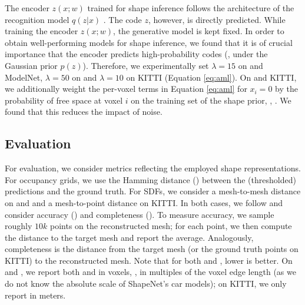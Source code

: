 
The encoder $z(x;w)$ trained for shape inference follows the architecture of the recognition model $q(z | x)$ . The code $z$, however, is directly predicted. While training the encoder $z(x;w)$, the generative model is kept fixed. In order to obtain well-performing models for shape inference, we found that it is of crucial importance that the encoder predicts high-probability codes (\ie, under the Gaussian prior $p(z)$). Therefore, we experimentally set $\lambda = 15$ on \clean and ModelNet, $\lambda = 50$ on \noisy and $\lambda = 10$ on KITTI (\cf Equation \eqref{eq:aml}).
On \noisy and KITTI, we additionally weight the per-voxel terms in Equation \eqref{eq:aml} for $x_i = 0$ by the probability of free space at voxel $i$ on the training set of the shape prior, \ie, \clean. We found that this reduces the impact of noise.




\subsection{Evaluation}
\label{subsec:experiments-evaluation}

For evaluation, we consider metrics reflecting the employed shape representations. For occupancy grids, we use the Hamming distance (\Abs) between the (thresholded) predictions and the ground truth. For SDFs, we consider a mesh-to-mesh distance on \clean and \noisy and a mesh-to-point distance on KITTI. In both cases, we follow \cite{Jensen2014CVPR} and consider accuracy (\Acc) and completeness (\Compl). To measure accuracy, we sample roughly $10k$ points on the reconstructed mesh; for each point, we then compute the distance to the target mesh and report the average. Analogously, completeness is the distance from the target mesh (or the ground truth points on KITTI) to the reconstructed mesh. Note that for both \Acc and \Compl, lower is better. On \clean and \noisy, we report both \Acc and \Compl in voxels, \ie, in multiples of the voxel edge length (as we do not know the absolute scale of ShapeNet's car models); on KITTI, we only report \Compl in meters. 

